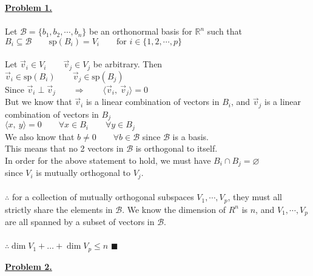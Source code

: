 \documentclass[12pt]{article}
\newcommand{\R}{\mathbb{R}}
\renewcommand{\qed}{\hfill$\blacksquare$}
\begin{document}
\noindent\hyperlink{toc}{\hypertarget{1}{\LARGE \noindent \underline{\textbf{Problem 1.}}}}
\\\\
Let $\displaystyle \mathcal{B} = \{b_1, b_2, \cdots, b_n \}$ be an orthonormal basis for $\R^n$ such that\\
$B_i \subseteq \mathcal{B} \qquad \text{sp}(B_i) = V_i \qquad \text{for } i \in \{1,2,\cdots,p\}$
\\\\
Let $\vec{v}_i \in V_i \qquad \vec{v}_j \in V_j$ be arbitrary. Then\\
$\vec{v}_i \in \text{sp}(B_i) \qquad \vec{v}_j \in \text{sp}(B_j)$\\
Since $\vec{v}_i \perp \vec{v}_j \qquad \Longrightarrow \qquad \langle \vec{v}_i, \ \vec{v}_j\rangle = 0$\\
But we know that $\vec{v}_i$ is a linear combination of vectors in $B_i$, and $\vec{v}_j$ is a linear combination of vectors in $B_j$\\
$\langle x, \ y\rangle = 0 \qquad \forall x \in B_i \qquad \forall y \in B_j$ \\
We also know that $b \not = 0 \qquad \forall b \in \mathcal{B}$ since $\mathcal{B}$ is a basis.\\
This means that no 2 vectors in $\mathcal{B}$ is orthogonal to itself. \\
In order for the above statement to hold, we must have $B_i \cap B_j = \varnothing$\\
since $V_i$ is mutually orthogonal to $V_j$.
\\\\
$\therefore$ for a collection of mutually orthogonal subspaces $V_1, \cdots, V_p$, they must all strictly share
the elements in $\mathcal{B}$. We know the dimension of $R^n$ is $n$, and $V_1, \cdots, V_p$ are all spanned
by a subset of vectors in $\mathcal{B}$.
\\\\
$\therefore \dim V_1 + \ldots + \dim V_p \leq n$ \qed

\newpage
{\LARGE \noindent \underline{\textbf{Problem 2.}}}\\
\end{document}
